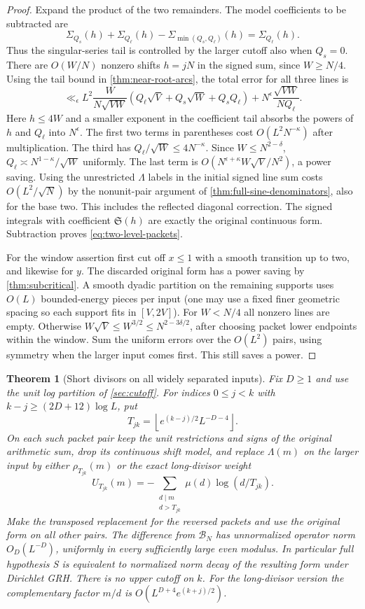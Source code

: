 \documentclass[11pt,a4paper]{article}
\numberwithin{equation}{section}
\newtheorem{theorem}{Theorem}[section]
\newcommand{\SSS}{\mathfrak S}
\newcommand{\B}{\mathcal B_N}
\begin{document}
\begin{proof}
Expand the product of the two remainders. The model coefficients
to be subtracted are
\[
 \Sigma_{Q_s}(h)+\Sigma_{Q_\ell}(h)
          -\Sigma_{\min(Q_s,Q_\ell)}(h)=\Sigma_{Q_\ell}(h).
\]
Thus the singular-series tail is controlled by the larger cutoff
also when $Q_s=0$. There are $O(W/N)$ nonzero shifts $h=jN$
in the signed sum, since $W\ge N/4$. Using the tail bound in
\cref{thm:near-root-arcs}, the total error for all three lines is
\[
 \ll_\epsilon L^2\frac W{N\sqrt{VW}}
       (Q_\ell\sqrt V+Q_s\sqrt W+Q_sQ_\ell)
       +N^\epsilon\frac{\sqrt{VW}}{N Q_\ell}.
\]
Here $h\le4W$ and a smaller exponent in the coefficient tail
absorbs the powers of $h$ and $Q_\ell$ into $N^\epsilon$.
The first two terms in parentheses cost $O(L^2 N^{-\kappa})$
after multiplication. The third has $Q_\ell/\sqrt W
\le4N^{-\kappa}$. Since $W\le N^{2-\delta}$,
$Q_\ell\asymp N^{1-\kappa}/\sqrt W$ uniformly. The last term
is $O(N^{\epsilon+\kappa}W\sqrt V/N^2)$, a power saving.
Using the unrestricted $\Lambda$ labels in the initial signed
line sum costs $O(L^2/\sqrt N)$ by the nonunit-pair argument of
\cref{thm:full-sine-denominators}, also for the base two.
This includes the reflected diagonal correction. The signed
integrals with coefficient $\SSS(h)$ are exactly the original
continuous form. Subtraction proves \eqref{eq:two-level-packets}.

For the window assertion first cut off $x\le1$ with a smooth
transition up to two, and likewise for $y$. The discarded
original form has a power saving by \cref{thm:subcritical}.
A smooth dyadic partition on the remaining supports uses
$O(L)$ bounded-energy pieces per input (one may use a fixed
finer geometric spacing so each support fits in $[V,2V]$).
For $W<N/4$ all nonzero lines are empty. Otherwise
$W\sqrt V\le W^{3/2}\le N^{2-3\delta/2}$, after choosing
packet lower endpoints within the window. Sum the uniform
errors over the $O(L^2)$ pairs, using symmetry when the larger
input comes first. This still saves a power.
\end{proof}

\begin{theorem}[Short divisors on all widely separated inputs]
\label{thm:full-far-long-divisor}
Fix $D\ge1$ and use the unit log partition of \cref{sec:cutoff}.
For indices $0\le j<k$ with $k-j\ge (2D+12)\log L$, put
\[
 T_{jk}=\left\lfloor e^{(k-j)/2} L^{-D-4}\right\rfloor .
\]
On each such packet pair keep the unit restrictions and signs
of the original arithmetic sum, drop its continuous shift
model, and replace $\Lambda(m)$ on the larger input by either
$\rho_{T_{jk}}(m)$ or the exact long-divisor weight
\[
 U_{T_{jk}}(m)=-\sum_{\substack{d\mid m\\d>T_{jk}}}
                         \mu(d)\log(d/T_{jk}).
\]
Make the transposed replacement for the reversed packets and
use the original form on all other pairs. The difference from
$\B$ has unnormalized operator norm $O_D(L^{-D})$, uniformly
in every sufficiently large even modulus. In particular full
hypothesis S is equivalent to normalized norm decay of the
resulting form under Dirichlet GRH. There is no upper cutoff
on $k$. For the long-divisor version the complementary factor
$m/d$ is $O(L^{D+4}e^{(k+j)/2})$.
\end{theorem}
\end{document}
